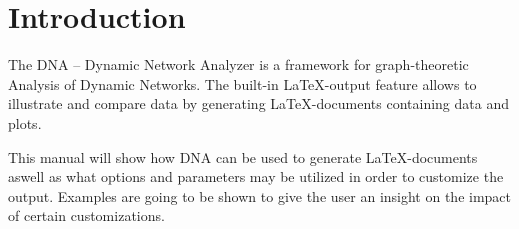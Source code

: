 \chapter{Introduction}
The DNA – Dynamic Network Analyzer is a framework for graph-theoretic Analysis of Dynamic Networks. The built-in LaTeX-output feature allows to illustrate and compare data by generating LaTeX-documents containing data and plots.

This manual will show how DNA can be used to generate LaTeX-documents aswell as what options and parameters may be utilized in order to customize the output. Examples are going to be shown to give the user an insight on the impact of certain customizations.


